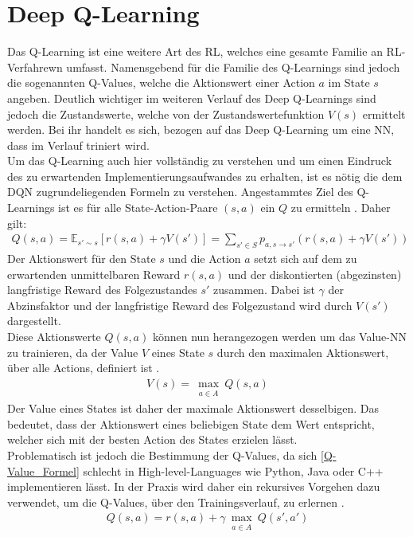 \section{Deep Q-Learning}
Das Q-Learning ist eine weitere Art des RL, welches eine gesamte Familie an RL-Verfahrewn umfasst. 
Namensgebend für die Familie des Q-Learnings sind jedoch die sogenannten Q-Values, welche die Aktionswert einer Action $a$ im State $s$ angeben. Deutlich wichtiger im weiteren Verlauf des Deep Q-Learnings sind jedoch die Zustandswerte, welche von der Zustandswertefunktion $V(s)$ ermittelt werden. Bei ihr handelt es sich, bezogen auf das Deep Q-Learning um eine NN, dass im Verlauf triniert wird.\\
Um das Q-Learning auch hier vollständig zu verstehen und um einen Eindruck des zu erwartenden Implementierungsaufwandes zu erhalten, ist es nötig die dem DQN zugrundeliegenden Formeln zu verstehen.
Angestammtes Ziel des Q-Learnings ist es für alle State-Action-Paare $(s,a)$ ein $Q$ zu ermitteln \cite{DRL}. Daher gilt:
\begin{align}
	\label{Q-Value_Formel}
	Q(s,a) = \mathbb{E}_{s'\sim s}[r(s,a) + \gamma V(s')] = \sum_{s' \in S}^{}p_{a,s \to s'}(r(s,a) + \gamma V(s'))
\end{align}
Der Aktionswert für den State $s$ und die Action $a$ setzt sich auf dem zu erwartenden unmittelbaren Reward $r(s,a)$ und der diskontierten (abgezinsten) langfristige Reward des Folgezustandes $s'$ zusammen. Dabei ist $\gamma$ der Abzinsfaktor und der langfristige Reward des Folgezustand wird durch $V(s')$ dargestellt.\\
Diese Aktionswerte $Q(s,a)$ können nun herangezogen werden um das Value-NN zu trainieren, da der Value $V$ eines State $s$ durch den maximalen Aktionswert, über alle Actions, definiert ist \cite{DRL}.
\begin{align}
	V(s) = \max_{\substack{a \in A}}Q(s,a)
\end{align}
Der Value eines States ist daher der maximale Aktionswert desselbigen. Das bedeutet, dass der Aktionswert eines beliebigen State dem Wert entspricht, welcher sich mit der besten Action des States erzielen lässt.\\
Problematisch ist jedoch die Bestimmung der Q-Values, da sich \ref{Q-Value_Formel} schlecht in High-level-Languages wie Python, Java oder C++ implementieren lässt. In der Praxis wird daher ein rekursives Vorgehen dazu verwendet, um die Q-Values, über den Trainingsverlauf, zu erlernen \cite{DRL}.
 \begin{align}
 	\label{Q-Value_Formel_r}
 	Q(s,a) = r(s,a) + \gamma \max_{\substack{a \in A}}Q(s',a')
 \end{align}
